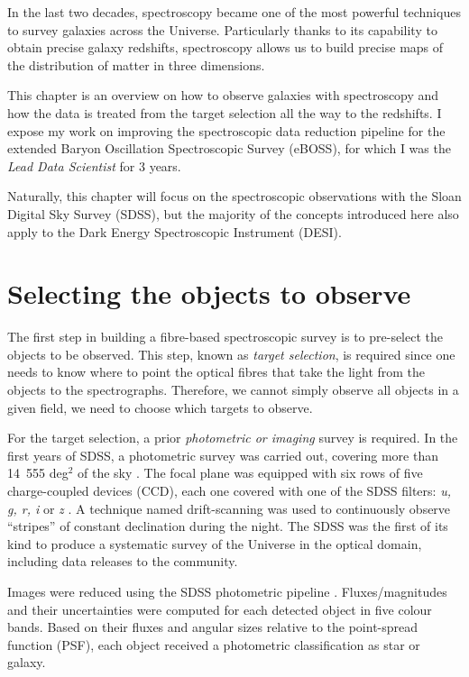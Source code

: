 In the last two decades, spectroscopy became one of the most powerful
techniques to survey galaxies across the Universe. 
Particularly thanks to its capability to obtain precise galaxy redshifts, 
spectroscopy allows us to build precise maps of the distribution 
of matter in three dimensions. 

This chapter is an overview on how to observe galaxies with 
spectroscopy and how the data is treated from the target selection 
all the way to the redshifts. 
I expose my work on improving the spectroscopic
data reduction pipeline for the extended Baryon Oscillation 
Spectroscopic Survey (eBOSS), for which I was the \emph{Lead Data Scientist}
for 3 years. 

Naturally, this chapter will 
focus on the spectroscopic observations with the 
Sloan Digital Sky Survey (SDSS), but the majority of the 
concepts introduced here also apply to the Dark Energy 
Spectroscopic Instrument (DESI). 


\section{Selecting the objects to observe}
\label{spectro:target}

The first step in building a fibre-based spectroscopic survey is to pre-select the objects to be observed. 
This step, known as \emph{target selection}, is required since one needs to know where to point 
the optical fibres that take the light from the objects to the spectrographs.
Therefore, we cannot simply observe all objects in a given field, we need to choose which targets to observe.

For the target selection, a prior \emph{photometric or imaging} 
survey is required. In the first years of SDSS, a photometric
survey was carried out, covering more than 
14~555 deg$^2$ of the sky \cite{yorkSloanDigitalSky2000}. 
The focal plane was equipped with six rows of five 
charge-coupled devices (CCD), each one covered with one of 
the SDSS filters: \textit{u, g, r, i} or \textit{z} 
\cite{gunnSloanDigitalSky1998, doiPhotometricResponseFunctions2010}.
A technique named drift-scanning was used to continuously observe 
``stripes'' of constant declination during the night.
The SDSS was the first of its kind to produce a systematic survey 
of the Universe in the optical domain, including data releases to the community.


Images were reduced using the SDSS photometric pipeline 
\cite{luptonSDSSImagingPipelines2001, padmanabhanImprovedPhotometricCalibration2008}. 
Fluxes/magnitudes and their uncertainties 
were computed for each detected object in five colour bands. 
Based on their fluxes and angular sizes relative to the 
point-spread function (PSF), each object received a 
photometric classification as star or galaxy.

